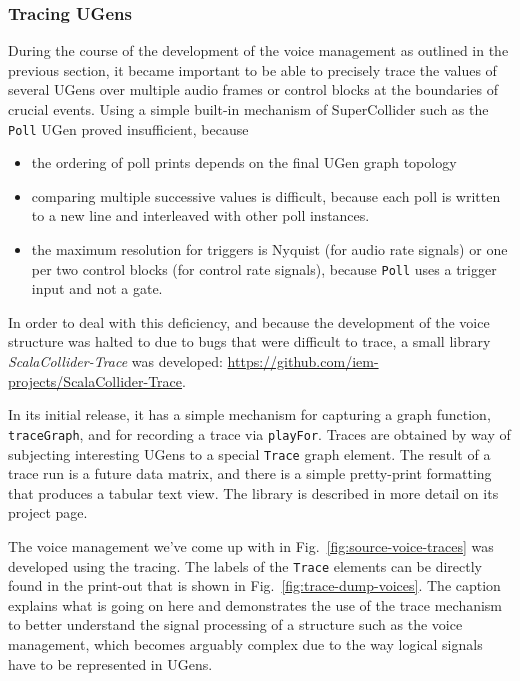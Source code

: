 \documentclass[11pt,a4paper]{article}
\newcommand{\figref}[1]{Fig.~\ref{#1}}
\newcommand{\software}[1]{\textit{#1}}
\begin{document}
\subsubsection*{Tracing UGens}

During the course of the development of the voice management as outlined in the previous section, it became important to be able to precisely trace the values of several UGens over multiple audio frames or control blocks at the boundaries of crucial events. Using a simple built-in mechanism of SuperCollider such as the \Verb!Poll! UGen proved insufficient, because
%
\begin{itemize}
\item the ordering of poll prints depends on the final UGen graph topology
\item comparing multiple successive values is difficult, because each poll is written to a new line and interleaved with other poll instances.
\item the maximum resolution for triggers is Nyquist (for audio rate signals) or one per two control blocks (for control rate signals), because \Verb!Poll! uses a trigger input and not a gate.
\end{itemize}
%
In order to deal with this deficiency, and because the development of the voice structure was halted to due to bugs that were difficult to trace, a small library \software{ScalaCollider-Trace} was developed: \url{https://github.com/iem-projects/ScalaCollider-Trace}.

In its initial release, it has a simple mechanism for capturing a graph function, \Verb!traceGraph!, and for recording a trace via \Verb!playFor!. Traces are obtained by way of subjecting interesting UGens to a special \Verb!Trace! graph element. The result of a trace run is a future data matrix, and there is a simple pretty-print formatting that produces a tabular text view. The library is described in more detail on its project page.

The voice management we've come up with in \figref{fig:source-voice-traces} was developed using the tracing. The labels of the \Verb!Trace! elements can be directly found in the print-out that is shown in \figref{fig:trace-dump-voices}. The caption explains what is going on here and demonstrates the use of the trace mechanism to better understand the signal processing of a structure such as the voice management, which becomes arguably complex due to the way logical signals have to be represented in UGens.
\end{document}
